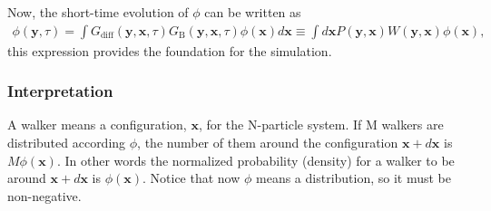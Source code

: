 \documentclass[12pt,letterpaper,UTF8]{report}
\begin{document}
{Now, the short-time evolution of $\phi$ can be written as
\begin{eqnarray}
\phi(\bm{y},\tau) =
\int
 {G}_{\textrm{diff}}(\bm{y},\bm{x},\tau)  {G}_{\textrm{B}}(\bm{y},\bm{x},\tau)
\phi(\bm{x}) d\bm{x}
\equiv \int d\bm{x} P(\bm{y},\bm{x}) W(\bm{y},\bm{x}) \phi(\bm{x}),
\label{fGdiffGBwoimp}
 \end{eqnarray}
this expression provides the foundation for the simulation.


\subsubsection{ Interpretation}

A walker means a configuration, $\bm{x}$, for the N-particle system. If M walkers are distributed according $\phi$, the number of them around the configuration $\bm{x}+d\bm{x}$ is $M \phi(\bm{x})$.
In other words the normalized probability (density) for a walker to be around $\bm{x}+d\bm{x}$ is $\phi(\bm{x})$. Notice that now $\phi$ means a distribution, so it must be non-negative.

}
\end{document}
